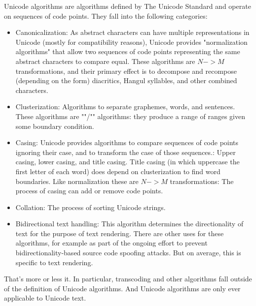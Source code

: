 \documentclass{wg21}
\begin{document}
Unicode algorithms are algorithms defined by The Unicode Standard and operate on sequences of code points. They fall into the following categories:

\begin{itemize}
\item Canonicalization: As abstract characters can have multiple representations in Unicode (mostly for compatibility reasons), Unicode provides "normalization algorithms" that allow two sequences of code points representing the same abstract characters to compare equal. These algorithms are $N->M$ transformations, and their primary effect is to decompose and recompose (depending on the form) diacritics, Hangul syllables, and other combined characters.

\item Clusterization: Algorithms to separate graphemes, words, and sentences. These algorithms are ""/"" algorithms: they produce a range of ranges given some boundary condition.

\item Casing: Unicode provides algorithms to compare sequences of code points ignoring their case, and to transform the case of those sequences.: Upper casing, lower casing, and title casing. Title casing (in which uppercase the first letter of each word) does depend on clusterization to find word boundaries.
Like normalization these are $N->M$ transformations: The process of casing can add or remove code points.

\item Collation: The process of sorting Unicode strings.

\item Bidirectional text handling: This algorithm determines the directionality of text for the purpose of text rendering. There are other uses for these algorithms, for example as part of the ongoing effort to prevent bidirectionality-based source code spoofing attacks. But on average, this is specific to text rendering.
\end{itemize}

That's more or less it.
In particular, transcoding and other algorithms fall outside of the definition of Unicode algorithms. And Unicode algorithms are only ever applicable to Unicode text.
\end{document}
